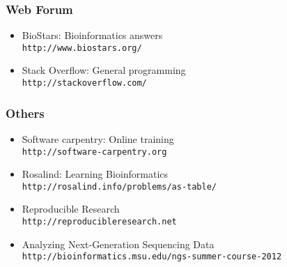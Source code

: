 \documentclass[ChapterTOCs,krantz2]{krantz} %
\begin{document}
\subsubsection{Web Forum}
\begin{itemize}
\item BioStars: Bioinformatics answers \\\texttt{http://www.biostars.org/}
\item Stack Overflow: General programming\\ \texttt{http://stackoverflow.com/}
\end{itemize}

\subsubsection{Others}
\begin{itemize}
\item Software carpentry: Online training
\\\texttt{http://software-carpentry.org}
\item Rosalind: Learning Bioinformatics \\\texttt{http://rosalind.info/problems/as-table/}
\item Reproducible Research \\\texttt{http://reproducibleresearch.net}
\item Analyzing Next-Generation Sequencing Data\\\texttt{http://bioinformatics.msu.edu/ngs-summer-course-2012}
\end{itemize}

 
\end{document}
